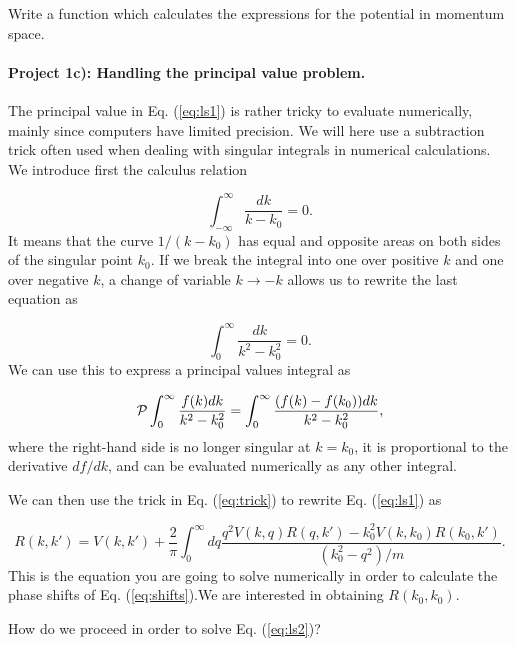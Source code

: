 \documentclass[%
oneside,                 %
final,                   %
10pt]{article}
\begin{document}
Write a function which calculates the expressions for the
potential in momentum space.

\paragraph{Project 1c): Handling the principal value problem.}
The principal value in Eq. (\ref{eq:ls1}) is rather tricky
to evaluate numerically, mainly since computers have limited
precision. We will here use a subtraction trick often used
when dealing with singular integrals in numerical calculations.
We introduce first the calculus relation

\begin{equation}
  \int_{-\infty}^{\infty} \frac{dk}{k-k_0} =0.
\end{equation}
It means that the curve $1/(k-k_0)$ has equal and opposite
areas on both sides of the singular point $k_0$. If we break
the integral into one over positive $k$ and one over 
negative $k$, a change of variable $k\rightarrow -k$ 
allows us to rewrite the last equation as

\begin{equation}
  \int_{0}^{\infty} \frac{dk}{k^2-k_0^2} =0.
\end{equation}
We can use this to express a principal values integral
as

\begin{equation}
  {\cal P}\int_{0}^{\infty} \frac{f(k)dk}{k^2-k_0^2} =
  \int_{0}^{\infty} \frac{(f(k)-f(k_0))dk}{k^2-k_0^2},
   \label{eq:trick}
\end{equation}
where the right-hand side is no longer singular at 
$k=k_0$, it is proportional to the derivative $df/dk$,
and can be evaluated numerically as any other integral.

We can then use the trick in Eq. (\ref{eq:trick}) to rewrite
Eq. (\ref{eq:ls1}) as

\begin{equation}
    R(k,k') = V(k,k') +\frac{2}{\pi}
                \int_0^{\infty}dq
                \frac{q^2V(k,q)R(q,k')-k_0^2V(k,k_0)R(k_0,k')  }
                     {(k_0^2-q^2)/m}.
   \label{eq:ls2}
\end{equation}
This is the equation you are going to solve numerically in order
to calculate the phase shifts of 
Eq. (\ref{eq:shifts}).We are interested in obtaining
$R(k_0,k_0)$.

How do we proceed in order to solve Eq. (\ref{eq:ls2})?
\end{document}
